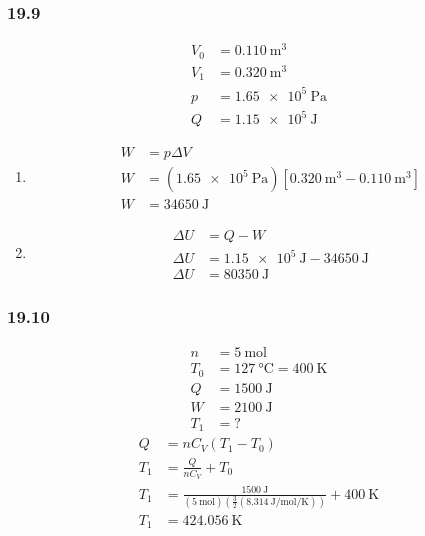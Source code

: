 \documentclass{article}
\begin{document}
\subsubsection{19.9}

\begin{align*}
	V_0 & = \SI{0.110}{\meter \cubed} \\
	V_1 & = \SI{0.320}{\meter \cubed} \\
	p & = \SI{1.65e5}{\pascal} \\
	Q & = \SI{1.15e5}{\joule}
\end{align*}
\begin{enumerate}[label = \textbf{(\alph*)}]
	\item
		\begin{align*}
			W & = p\Delta V \\
			W & = (\SI{1.65e5}{\pascal}) \left[ \SI{0.320}{\meter \cubed} - \SI{0.110}{\meter \cubed} \right] \\
			W & = \SI{34650}{\joule}
		\end{align*}
	\item
		\begin{align*}
			\Delta U & = Q - W \\
			\Delta U & = \SI{1.15e5}{\joule} - \SI{34650}{\joule} \\
			\Delta U & = \SI{80350}{\joule}
		\end{align*}
\end{enumerate}

\subsubsection{19.10}

\begin{align*}
	n & = \SI{5}{\mole} \\
	T_0 & = \SI{127}{\celsius} = \SI{400}{\kelvin} \\
	Q & = \SI{1500}{\joule} \\
	W & = \SI{2100}{\joule} \\
	T_1 & = ?
\end{align*}
\begin{align*}
	Q & = nC_V(T_1 - T_0) \\
	T_1 & = \frac{ Q }{ nC_V } + T_0 \\
	T_1 & = \frac{ \SI{1500}{\joule} }{ (\SI{5}{\mole}) \left( \frac{ 3 }{ 2 }(\SI{8.314}{\joule \per \mole \per \kelvin}) \right) } + \SI{400}{\kelvin} \\
	T_1 & = \SI{424.056}{\kelvin}
\end{align*}
\end{document}
